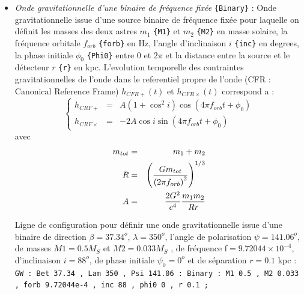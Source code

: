 \documentclass[a4paper,english,12pt]{article}
\begin{document}
\begin{itemize}
\item { \it Onde gravitationnelle d'une binaire de fréquence fixée } \texttt{\{Binary\}} : Onde gravitationnelle issue d'une source binaire de fréquence fixée pour laquelle on d\'efinit les masses des deux astres $m_{1}$ \texttt{\{M1\}} et $m_{2}$ \texttt{\{M2\}} en masse solaire, la fr\'equence orbitale $f_{orb}$ \texttt{\{forb\}} en Hz, l'angle d’inclinaison $i$ \texttt{\{inc\}} en degrees, la phase initiale $\phi_{0}$ \texttt{\{Phi0\}} entre $0$ et $2\pi$ et la distance entre la source et le d\'etecteur $r$ \texttt{\{r\}} en kpc. L'evolution temporelle des contraintes gravitationnelles de l'onde dans le referentiel propre de l'onde (CFR : Canonical Reference Frame) ${h}_{CFR+} (t)$ et ${h}_{CFR\times} (t)$ correspond a : 
\begin{equation} 
\left\{ \begin{array}{lll}  
h_{CRF+} &=& A \left(1 + \cos^2 i \right) \cos \left( 4 \pi f_{orb} t + \phi_0 \right)\\ 
h_{CRF\times} &=& -2 A \cos i  \sin \left( 4 \pi f_{orb} t + \phi_0 \right) 
\end{array} \right.  
\label{GWBinaryFixedFreq} 
\end{equation} 
avec 
\begin{eqnarray} 
m_{tot} &=& m_1 + m_2 \label{mtot}\\ 
R &=& {\left( { G m_{tot} \over {\left( 2 \pi f_{orb} \right)}^2} \right)}^{1/3} \label{RBinFixF}\\ 
A &=& {2 G^2 \over c^4} {m_1 m_2 \over R r} \label{ABinFixF} 
\end{eqnarray}

Ligne de configuration pour d\'efinir une onde gravitationnelle issue d'une binaire de direction $\beta = 37.34^{o}$, $\lambda= 350^{o}$, l’angle de polarisation $\psi = 141.06^{o}$, de masses $M1 = 0.5 M_S$ et $M2 = 0.033 M_S$ , de fr\'equence f$ = 9.72044 \times 10^{-4}$, d'inclinaison $i = 88^{o}$, de phase initiale $\psi_0 = 0^{o}$ et de s\'eparation $r = 0.1$ kpc : \\
\hphantom{aaaaa}\texttt{GW : Bet 37.34 , Lam 350 , Psi 141.06 : Binary : M1 0.5 , M2 0.033 , forb 9.72044e-4 , inc 88 , phi0 0 , r 0.1 ;}  \\


\end{itemize}
\end{document}
